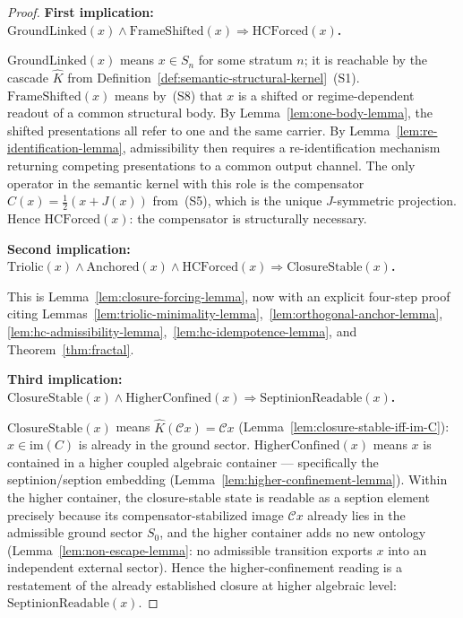 \begin{proof}
\textbf{First implication:
$\mathrm{GroundLinked}(x)\wedge\mathrm{FrameShifted}(x)
\Rightarrow\mathrm{HCForced}(x)$.}

$\mathrm{GroundLinked}(x)$ means $x\in S_n$ for some stratum $n$; it is
reachable by the cascade $\hat{K}$ from Definition~\ref{def:semantic-structural-kernel}~(S1).
$\mathrm{FrameShifted}(x)$ means by~(S8) that $x$ is a shifted or
regime-dependent readout of a common structural body.
By Lemma~\ref{lem:one-body-lemma}, the shifted presentations all refer
to one and the same carrier. By Lemma~\ref{lem:re-identification-lemma},
admissibility then requires a re-identification mechanism returning
competing presentations to a common output channel. The only operator
in the semantic kernel with this role is the compensator $C(x)=\tfrac{1}{2}(x+J(x))$
from~(S5), which is the unique $J$-symmetric projection.
Hence $\mathrm{HCForced}(x)$: the compensator is structurally necessary.

\smallskip
\textbf{Second implication:
$\mathrm{Triolic}(x)\wedge\mathrm{Anchored}(x)\wedge\mathrm{HCForced}(x)
\Rightarrow\mathrm{ClosureStable}(x)$.}

This is Lemma~\ref{lem:closure-forcing-lemma}, now with an explicit
four-step proof citing
Lemmas~\ref{lem:triolic-minimality-lemma},~\ref{lem:orthogonal-anchor-lemma},
\ref{lem:hc-admissibility-lemma},~\ref{lem:hc-idempotence-lemma},
and Theorem~\ref{thm:fractal}.

\smallskip
\textbf{Third implication:
$\mathrm{ClosureStable}(x)\wedge\mathrm{HigherConfined}(x)
\Rightarrow\mathrm{SeptinionReadable}(x)$.}

$\mathrm{ClosureStable}(x)$ means $\hat{K}(\mathcal{C}x)=\mathcal{C}x$
(Lemma~\ref{lem:closure-stable-iff-im-C}):
$x\in\mathrm{im}(C)$ is already in the ground sector.
$\mathrm{HigherConfined}(x)$ means $x$ is contained in a higher coupled
algebraic container — specifically the septinion/seption embedding
(Lemma~\ref{lem:higher-confinement-lemma}).
Within the higher container, the closure-stable state is readable as a
seption element precisely because its compensator-stabilized image
$\mathcal{C}x$ already lies in the admissible ground sector $S_0$, and
the higher container adds no new ontology
(Lemma~\ref{lem:non-escape-lemma}: no admissible transition exports $x$
into an independent external sector).
Hence the higher-confinement reading is a restatement of the already
established closure at higher algebraic level:
$\mathrm{SeptinionReadable}(x)$.
\end{proof}

